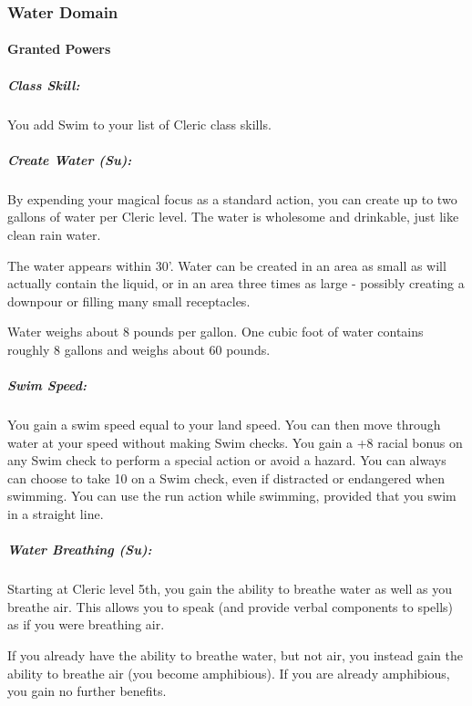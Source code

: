 \subsubsection{Water Domain}
\paragraph{Granted Powers}
\subparagraph{Class Skill:} 
You add Swim to your list of Cleric class skills.
\subparagraph[Create Water]{Create Water (Su):}
\label{sec:CreateWater}
By expending your magical focus as a standard action, you can create up to two gallons of water per Cleric level. 
The water is wholesome and drinkable, just like clean rain water.

The water appears within 30'. Water can be created in an area as small as will actually contain the liquid, or in an area three times as large - possibly creating a downpour or filling many small receptacles.

Water weighs about 8 pounds per gallon. One cubic foot of water contains roughly 8 gallons and weighs about 60 pounds.

\subparagraph{Swim Speed:}
You gain a swim speed equal to your land speed.
You can then move through water at your speed without making Swim checks.
You gain a +8 racial bonus on any Swim check to perform a special action or avoid a hazard. 
You can always can choose to take 10 on a Swim check, even if distracted or endangered when swimming. 
You can use the run action while swimming, provided that you swim in a straight line.
\subparagraph[Water Breathing]{Water Breathing (Su):}
\label{sec:WaterBreathing}
Starting at Cleric level 5th, you gain the ability to breathe water as well as you breathe air. This allows you to speak (and provide verbal components to spells) as if you were breathing air.

If you already have the ability to breathe water, but not air, you instead gain the ability to breathe air (you become amphibious). If you are already amphibious, you gain no further benefits.

